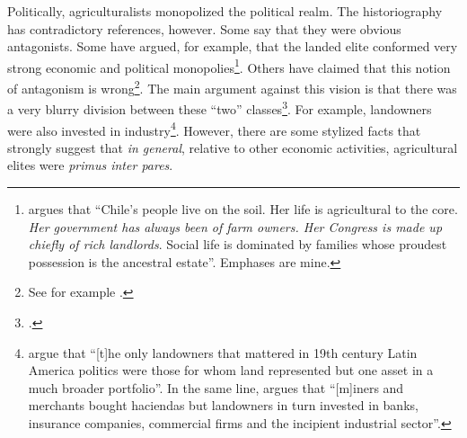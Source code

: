 \documentclass[onesided]{article}\usepackage[]{graphicx}\usepackage[]{color}
\begin{document}
Politically, agriculturalists monopolized the political realm. The historiography has contradictory references, however. Some say that they were obvious antagonists. Some have argued, for example, that the landed elite conformed very strong economic and political monopolies\footnote{
	\citet[p. 15]{McBride:1971fv} argues that ``Chile's people live on the soil. Her life is agricultural to the core. \emph{Her government has always been of farm owners. Her Congress is made up chiefly of rich landlords}. Social life is dominated by families whose proudest possession is the ancestral estate''. Emphases are mine.
}. Others have claimed that this notion of antagonism is wrong\footnote{
	See for example  \citet[p. 125]{Mamalakis:1976kx}.
	}. The main argument against this vision is that there was a very blurry division between these ``two'' classes\footnote{
	\citet[p. 30, 44, 94, 108]{Bauer:2008kx}.
	}. For example, landowners were also invested in industry\footnote{
	\citet[p. 23]{Coatsworth2002} argue that ``[t]he only landowners that mattered in 19th century Latin America politics were those for whom land represented but one asset in a much broader portfolio''. In the same line, \citet[180]{Bauer:2008kx} argues that  ``[m]iners and merchants bought haciendas but landowners in turn invested in banks, insurance companies, commercial firms and the incipient industrial sector''.
	}. However, there are some stylized facts that strongly suggest that \emph{in general}, relative to other economic activities, agricultural elites were \emph{primus inter pares}. %
\end{document}
